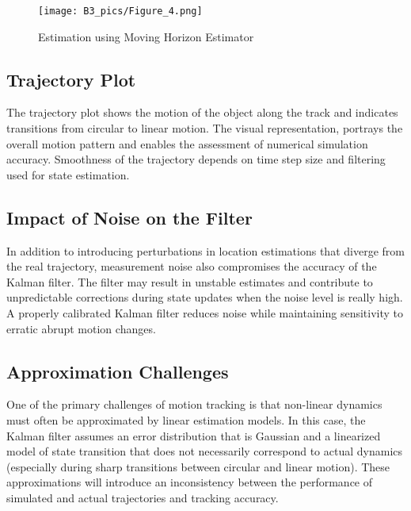 \documentclass[a4paper,11pt]{article}
\begin{document}
\begin{figure} [H]
    \centering
    \texttt{[image: B3\_pics/Figure\_4.png]}
    \caption{Estimation using Moving Horizon Estimator}
    \label{fig:4}
\end{figure}



\subsection*{Trajectory Plot}
The trajectory plot shows the motion of the object along the track and indicates transitions from circular to linear motion. The visual representation, portrays the overall motion pattern and enables the assessment of numerical simulation accuracy. 
Smoothness of the trajectory depends on time step size and filtering used for state estimation. 

\subsection*{Impact of Noise on the Filter}
In addition to introducing perturbations in location estimations that diverge from the real trajectory, measurement noise also compromises the accuracy of the Kalman filter. The filter may result in unstable estimates and contribute to unpredictable corrections during state updates when the noise level is really high. A properly calibrated Kalman filter reduces noise while maintaining sensitivity to erratic abrupt motion changes.

\subsection*{Approximation Challenges}
One of the primary challenges of motion tracking is that non-linear dynamics must often be approximated by linear estimation models. In this case, the Kalman filter assumes an error distribution that is Gaussian and a linearized model of state transition that does not necessarily correspond to actual dynamics (especially during sharp transitions between circular and linear motion). These approximations will introduce an inconsistency between the performance of simulated and actual trajectories and tracking accuracy. 
\end{document}
